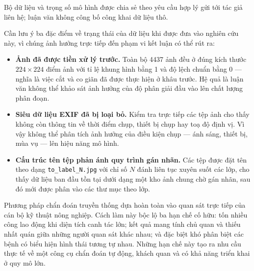 Bộ dữ liệu và trọng số mô hình được chia sẻ theo yêu cầu hợp lý gửi tới tác giả
liên hệ; luận văn không công bố công khai dữ liệu thô.

Cần lưu ý ba đặc điểm về trạng thái của dữ liệu khi được đưa vào nghiên cứu này,
vì chúng ảnh hưởng trực tiếp đến phạm vi kết luận có thể rút ra:

\begin{itemize}
    \item \textbf{Ảnh đã được tiền xử lý trước.} Toàn bộ \num{4437} ảnh đều ở
          đúng kích thước $224 \times 224$ điểm ảnh với tỉ lệ khung hình bằng 1
          và độ lệch chuẩn bằng 0 --- nghĩa là việc cắt và co giãn đã được thực
          hiện ở khâu trước. Hệ quả là luận văn không thể khảo sát ảnh hưởng của
          độ phân giải đầu vào lên chất lượng phân đoạn.
    \item \textbf{Siêu dữ liệu EXIF đã bị loại bỏ.} Kiểm tra trực tiếp các tệp
          ảnh cho thấy không còn thông tin về thời điểm chụp, thiết bị chụp hay
          toạ độ định vị. Vì vậy không thể phân tích ảnh hưởng của điều kiện chụp
          --- ánh sáng, thiết bị, mùa vụ --- lên hiệu năng mô hình.
    \item \textbf{Cấu trúc tên tệp phản ánh quy trình gán nhãn.} Các tệp được đặt
          tên theo dạng \texttt{to\_\allowbreak label\_\allowbreak N.\allowbreak jpg} với chỉ số $N$ đánh liên tục
          xuyên suốt các lớp, cho thấy dữ liệu ban đầu tồn tại dưới dạng một kho
          ảnh chung chờ gán nhãn, sau đó mới được phân vào các thư mục theo lớp.
\end{itemize}


Phương pháp chẩn đoán truyền thống dựa hoàn toàn vào quan sát trực tiếp của cán
bộ kỹ thuật nông nghiệp. Cách làm này bộc lộ ba hạn chế cố hữu: tốn nhiều công
lao động khi diện tích canh tác lớn; kết quả mang tính chủ quan và thiếu nhất
quán giữa những người quan sát khác nhau; và đặc biệt khó phân biệt các bệnh có
biểu hiện hình thái tương tự nhau. Những hạn chế này tạo ra nhu cầu thực tế về
một công cụ chẩn đoán tự động, khách quan và có khả năng triển khai ở quy mô lớn.

